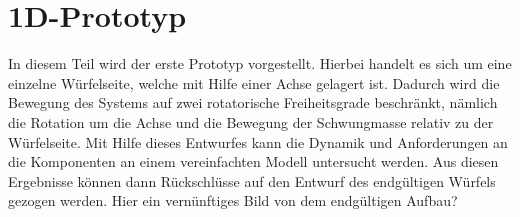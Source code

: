 \section{1D-Prototyp}
In diesem Teil wird der erste Prototyp vorgestellt. Hierbei handelt es sich um eine einzelne Würfelseite, welche mit Hilfe einer Achse gelagert ist. Dadurch wird die Bewegung des Systems auf zwei rotatorische Freiheitsgrade beschränkt, nämlich die Rotation um die Achse und die Bewegung der Schwungmasse relativ zu der Würfelseite. Mit Hilfe dieses Entwurfes kann die Dynamik und Anforderungen an die Komponenten an einem vereinfachten Modell untersucht werden. Aus diesen Ergebnisse können dann Rückschlüsse auf den Entwurf des endgültigen Würfels gezogen werden.
\newline
Hier ein vernünftiges Bild von dem endgültigen Aufbau?